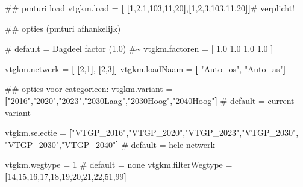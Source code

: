 \documentclass[
  letterpaper,
  DIV=11,
  numbers=noendperiod]{scrreprt}
\newenvironment{Shaded}{\begin{snugshade}}{\end{snugshade}}
\newcommand{\AttributeTok}[1]{\textcolor[rgb]{0.40,0.45,0.13}{#1}}
\newcommand{\CommentTok}[1]{\textcolor[rgb]{0.37,0.37,0.37}{#1}}
\newcommand{\DecValTok}[1]{\textcolor[rgb]{0.68,0.00,0.00}{#1}}
\newcommand{\KeywordTok}[1]{\textcolor[rgb]{0.00,0.23,0.31}{\textbf{#1}}}
\newcommand{\NormalTok}[1]{\textcolor[rgb]{0.00,0.23,0.31}{#1}}
\newcommand{\OperatorTok}[1]{\textcolor[rgb]{0.37,0.37,0.37}{#1}}
\newcommand{\StringTok}[1]{\textcolor[rgb]{0.13,0.47,0.30}{#1}}
\begin{document}
\begin{Shaded}
\begin{Highlighting}[]

\CommentTok{\#\# pmturi load}
\NormalTok{vtgkm}\AttributeTok{.load}          \OperatorTok{=} \KeywordTok{[} \KeywordTok{[}\DecValTok{1}\NormalTok{,}\DecValTok{2}\NormalTok{,}\DecValTok{1}\NormalTok{,}\DecValTok{103}\NormalTok{,}\DecValTok{11}\NormalTok{,}\DecValTok{20}\KeywordTok{]}\NormalTok{,}\KeywordTok{[}\DecValTok{1}\NormalTok{,}\DecValTok{2}\NormalTok{,}\DecValTok{3}\NormalTok{,}\DecValTok{103}\NormalTok{,}\DecValTok{11}\NormalTok{,}\DecValTok{20}\KeywordTok{]]}\CommentTok{\# verplicht!}

\CommentTok{\#\# opties (pmturi afhankelijk)}

\CommentTok{\# default = Dagdeel factor (1.0)}
\CommentTok{\#\textasciitilde{} vtgkm.factoren      = [ 1.0                    1.0    1.0    1.0        ]  }

\NormalTok{vtgkm}\AttributeTok{.netwerk}       \OperatorTok{=} \KeywordTok{[} \KeywordTok{[}\DecValTok{2}\NormalTok{,}\DecValTok{1}\KeywordTok{]}\NormalTok{,                }\KeywordTok{[}\DecValTok{2}\NormalTok{,}\DecValTok{3}\KeywordTok{]]} 
\NormalTok{vtgkm}\AttributeTok{.loadNaam}      \OperatorTok{=} \KeywordTok{[} \StringTok{"Auto\_os"}\NormalTok{,            }\StringTok{"Auto\_as"}\KeywordTok{]} 

\CommentTok{\#\# opties voor categorieen:}
\NormalTok{vtgkm}\AttributeTok{.variant} \OperatorTok{=} \KeywordTok{[}\StringTok{"2016"}\NormalTok{,}\StringTok{"2020"}\NormalTok{,}\StringTok{"2023"}\NormalTok{,}\StringTok{"2030Laag"}\NormalTok{,}\StringTok{"2030Hoog"}\NormalTok{,}\StringTok{"2040Hoog"}\KeywordTok{]} 
\CommentTok{\# default = current variant}

\NormalTok{vtgkm}\AttributeTok{.selectie} \OperatorTok{=} \KeywordTok{[}\StringTok{"VTGP\_2016"}\NormalTok{,}\StringTok{"VTGP\_2020"}\NormalTok{,}\StringTok{"VTGP\_2023"}\NormalTok{,}\StringTok{"VTGP\_2030"}\NormalTok{,}
\StringTok{"VTGP\_2030"}\NormalTok{,}\StringTok{"VTGP\_2040"}\KeywordTok{]}    
\CommentTok{\# default = hele netwerk}


\NormalTok{vtgkm}\AttributeTok{.wegtype} \OperatorTok{=} \DecValTok{1}        \CommentTok{\# default = none}
\NormalTok{vtgkm}\AttributeTok{.filterWegtype} \OperatorTok{=} \KeywordTok{[}\DecValTok{14}\NormalTok{,}\DecValTok{15}\NormalTok{,}\DecValTok{16}\NormalTok{,}\DecValTok{17}\NormalTok{,}\DecValTok{18}\NormalTok{,}\DecValTok{19}\NormalTok{,}\DecValTok{20}\NormalTok{,}\DecValTok{21}\NormalTok{,}\DecValTok{22}\NormalTok{,}\DecValTok{51}\NormalTok{,}\DecValTok{99}\KeywordTok{]}    
\end{Highlighting}
\end{Shaded}
\end{document}
